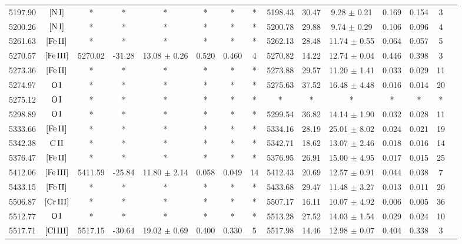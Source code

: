 \documentclass{article}
\begin{document}
\begin{table*}
\begin{adjustbox}{width=\textwidth}
\begin{tabular}{ccccccccccccccc}
5197.90 & $\mbox{[N}\thinspace \mbox{I]}$ & * & * & * & * & * & * & 5198.43 & 30.47 & 9.28 $\pm$ 0.21 & 0.169 & 0.154 & 3 &  \\
5200.26 & $\mbox{[N}\thinspace \mbox{I]}$ & * & * & * & * & * & * & 5200.78 & 29.88 & 9.74 $\pm$ 0.29 & 0.106 & 0.096 & 4 &  \\
5261.63 & $\mbox{[Fe}\thinspace \mbox{II]}$ & * & * & * & * & * & * & 5262.13 & 28.48 & 11.74 $\pm$ 0.55 & 0.064 & 0.057 & 5 &  \\
5270.57 & $\mbox{[Fe}\thinspace \mbox{III]}$ & 5270.02 & -31.28 & 13.08 $\pm$ 0.26 & 0.520 & 0.460 & 4 & 5270.82 & 14.22 & 12.74 $\pm$ 0.04 & 0.446 & 0.398 & 3 &  \\
5273.36 & $\mbox{[Fe}\thinspace \mbox{II]}$ & * & * & * & * & * & * & 5273.88 & 29.57 & 11.20 $\pm$ 1.41 & 0.033 & 0.029 & 11 &  \\
5274.97 & $\mbox{O}\thinspace \mbox{I}$ & * & * & * & * & * & * & 5275.63 & 37.52 & 16.48 $\pm$ 4.48 & 0.016 & 0.014 & 20 &  \\
5275.12 & $\mbox{O}\thinspace \mbox{I}$ & * & * & * & * & * & * & * & * & * & * & * & * &  \\
5298.89 & $\mbox{O}\thinspace \mbox{I}$ & * & * & * & * & * & * & 5299.54 & 36.82 & 14.14 $\pm$ 1.90 & 0.032 & 0.028 & 11 &  \\
5333.66 & $\mbox{[Fe}\thinspace \mbox{II]}$ & * & * & * & * & * & * & 5334.16 & 28.19 & 25.01 $\pm$ 8.02 & 0.024 & 0.021 & 19 &  \\
5342.38 & $\mbox{C}\thinspace \mbox{II}$ & * & * & * & * & * & * & 5342.71 & 18.62 & 13.07 $\pm$ 2.46 & 0.018 & 0.016 & 14 &  \\
5376.47 & $\mbox{[Fe}\thinspace \mbox{II]}$ & * & * & * & * & * & * & 5376.95 & 26.91 & 15.00 $\pm$ 4.95 & 0.017 & 0.015 & 25 &  \\
5412.06 & $\mbox{[Fe}\thinspace \mbox{III]}$ & 5411.59 & -25.84 & 11.80 $\pm$ 2.14 & 0.058 & 0.049 & 14 & 5412.43 & 20.69 & 12.57 $\pm$ 0.91 & 0.044 & 0.038 & 7 &  \\
5433.15 & $\mbox{[Fe}\thinspace \mbox{II]}$ & * & * & * & * & * & * & 5433.68 & 29.47 & 11.48 $\pm$ 3.27 & 0.013 & 0.011 & 20 &  \\
5506.87 & $\mbox{[Cr}\thinspace \mbox{III]}$ & * & * & * & * & * & * & 5507.17 & 16.11 & 10.07 $\pm$ 4.92 & 0.006 & 0.005 & 36 &  \\
5512.77 & $\mbox{O}\thinspace \mbox{I}$ & * & * & * & * & * & * & 5513.28 & 27.52 & 14.03 $\pm$ 1.54 & 0.029 & 0.024 & 10 &  \\
5517.71 & $\mbox{[Cl}\thinspace \mbox{III]}$ & 5517.15 & -30.64 & 19.02 $\pm$ 0.69 & 0.400 & 0.330 & 5 & 5517.98 & 14.46 & 12.98 $\pm$ 0.07 & 0.404 & 0.338 & 3 &  \\

\end{tabular}
\end{adjustbox}
\end{table*}
\end{document}
